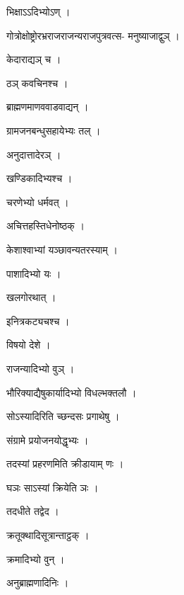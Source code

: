 \documentclass[10pt, openany]{book}
\begin{document}
\noindent भिक्षाऽऽदिभ्योऽण् ।

\noindent गोत्रोक्षोष्ट्रोरभ्रराजराजन्यराजपुत्रवत्स- मनुष्याजाद्वुञ् ।

\noindent केदाराद्यञ् च ।

\noindent ठञ् कवचिनश्च ।

\noindent ब्राह्मणमाणववाडवाद्यन् ।

\noindent ग्रामजनबन्धुसहायेभ्यः तल् ।

\noindent अनुदात्तादेरञ् ।

\noindent खण्डिकादिभ्यश्च ।

\noindent चरणेभ्यो धर्मवत् ।

\noindent अचित्तहस्तिधेनोष्ठक् ।

\noindent केशाश्वाभ्यां यञ्छावन्यतरस्याम् ।

\noindent पाशादिभ्यो यः ।

\noindent खलगोरथात् ।

\noindent इनित्रकट्यचश्च ।

\noindent विषयो देशे ।

\noindent राजन्यादिभ्यो वुञ् ।

\noindent भौरिक्याद्यैषुकार्यादिभ्यो विधल्भक्तलौ ।

\noindent सोऽस्यादिरिति च्छन्दसः प्रगाथेषु ।

\noindent संग्रामे प्रयोजनयोद्धृभ्यः ।

\noindent तदस्यां प्रहरणमिति क्रीडायाम् णः ।

\noindent घञः साऽस्यां क्रियेति ञः ।

\noindent तदधीते तद्वेद ।

\noindent क्रतूक्थादिसूत्रान्ताट्ठक् ।

\noindent क्रमादिभ्यो वुन् ।

\noindent अनुब्राह्मणादिनिः ।
\end{document}
